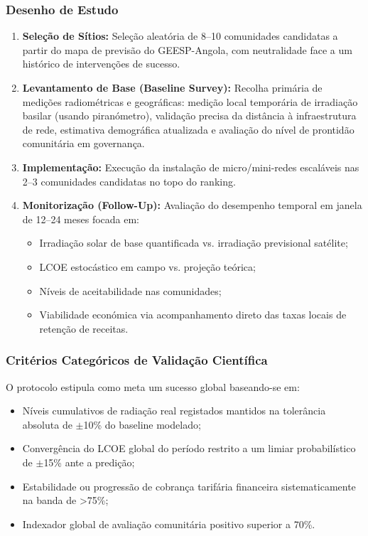 \documentclass[12pt, a4paper]{article}
\begin{document}
\subsubsection{Desenho de Estudo}
\begin{enumerate}
\item \textbf{Seleção de Sítios:} Seleção aleatória de 8–10 comunidades candidatas a partir do mapa de previsão do GEESP-Angola, com neutralidade face a um histórico de intervenções de sucesso.
\item \textbf{Levantamento de Base (Baseline Survey):} Recolha primária de medições radiométricas e geográficas: medição local temporária de irradiação basilar (usando piranómetro), validação precisa da distância à infraestrutura de rede, estimativa demográfica atualizada e avaliação do nível de prontidão comunitária em governança.
\item \textbf{Implementação:} Execução da instalação de micro/mini-redes escaláveis nas 2–3 comunidades candidatas no topo do ranking.
\item \textbf{Monitorização (Follow-Up):} Avaliação do desempenho temporal em janela de 12–24 meses focada em:
  \begin{itemize}
    \item Irradiação solar de base quantificada vs. irradiação previsional satélite;
    \item LCOE estocástico em campo vs. projeção teórica;
    \item Níveis de aceitabilidade nas comunidades;
    \item Viabilidade económica via acompanhamento direto das taxas locais de retenção de receitas.
  \end{itemize}
\end{enumerate}

\subsubsection{Critérios Categóricos de Validação Científica}
O protocolo estipula como meta um sucesso global baseando-se em:
\begin{itemize}
  \item Níveis cumulativos de radiação real registados mantidos na tolerância absoluta de $\pm$10\% do baseline modelado;
  \item Convergência do LCOE global do período restrito a um limiar probabilístico de $\pm$15\% ante a predição;
  \item Estabilidade ou progressão de cobrança tarifária financeira sistematicamente na banda de \textgreater75\%;
  \item Indexador global de avaliação comunitária positivo superior a 70\%.
\end{itemize}
\end{document}
